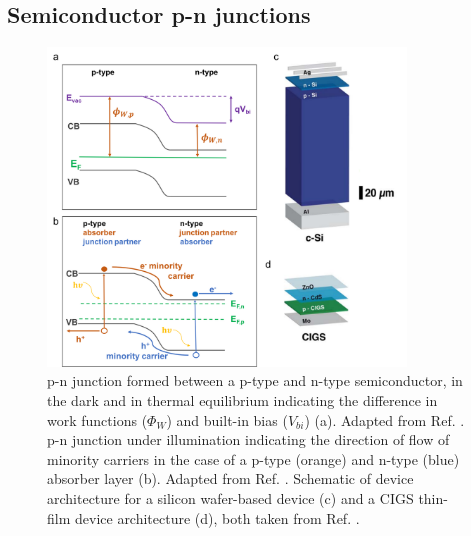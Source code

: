 \documentclass[11pt, twoside]{report}
\begin{document}
\subsection{Semiconductor p-n junctions}
\begin{figure}[h!]
  \centering
    \includegraphics[width=0.85\textwidth]{figures/p-n_schematic.png}
    \caption[p-n junction formed between a p-type and n-type semiconductor, in the dark and in thermal equilibrium indicating the difference in work functions ($\Phi_W$) and built-in bias ($V_{bi}$) (a). p-n junction under illumination indicating the direction of flow of minority carriers in the case of a p-type (orange) and n-type (blue) absorber layer (b). Schematic of device architecture for a silicon wafer-based device (c) and a CIGS thin-film device architecture (d).]{p-n junction formed between a p-type and n-type semiconductor, in the dark and in thermal equilibrium indicating the difference in work functions ($\Phi_W$) and built-in bias ($V_{bi}$) (a). Adapted from Ref. . p-n junction under illumination indicating the direction of flow of minority carriers in the case of a p-type (orange) and n-type (blue) absorber layer (b). Adapted from Ref. . Schematic of device architecture for a silicon wafer-based device (c) and a CIGS thin-film device architecture (d), both taken from Ref. .}
  \label{p-n_schematic}
\end{figure}
\end{document}
